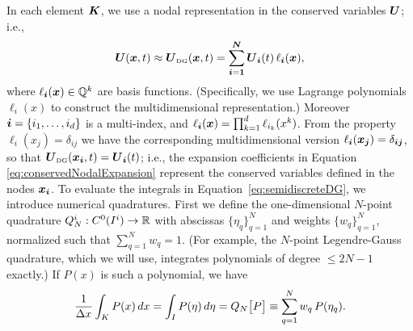 \documentclass[10pt,preprint]{aastex}
\begin{document}
In each element $\boldsymbol{K}$, we use a nodal representation in the conserved variables $\boldsymbol{U}$; i.e.,
\begin{equation}
  \boldsymbol{U}(\boldsymbol{x},t)\approx
  \boldsymbol{U}_{\mbox{\tiny DG}}(\boldsymbol{x},t)=\sum_{\boldsymbol{i}=\boldsymbol{1}}^{\boldsymbol{N}}\boldsymbol{U}_{\boldsymbol{i}}(t)\,\ell_{\boldsymbol{i}}(\boldsymbol{x}),
  \label{eq:conservedNodalExpansion}
\end{equation}
where $\ell_{\boldsymbol{i}}(\boldsymbol{x})\in\mathbb{Q}^{k}$ are basis functions.  
(Specifically, we use Lagrange polynomials $\ell_{i}(x)$ to construct the multidimensional representation.)  
Moreover $\boldsymbol{i}=\{i_{1},\ldots,i_{d}\}$ is a multi-index, and $\ell_{\boldsymbol{i}}(\boldsymbol{x})=\prod_{k=1}^{d}\ell_{i_{k}}(x^{k})$.  
From the property $\ell_{i}(x_{j})=\delta_{ij}$ we have the corresponding multidimensional version $\ell_{\boldsymbol{i}}(\boldsymbol{x}_{\boldsymbol{j}})=\delta_{\boldsymbol{i}\boldsymbol{j}}$, so that $\boldsymbol{U}_{\mbox{\tiny DG}}(\boldsymbol{x}_{\boldsymbol{i}},t)=\boldsymbol{U}_{\boldsymbol{i}}(t)$; i.e., the expansion coefficients in Equation \eqref{eq:conservedNodalExpansion} represent the conserved variables defined in the nodes $\boldsymbol{x}_{\boldsymbol{i}}$.  
To evaluate the integrals in Equation~\eqref{eq:semidiscreteDG}, we introduce numerical quadratures.  
First we define the one-dimensional $N$-point quadrature $Q_{N}^{i}:C^{0}(I^{i})\to\mathbb{R}$ with abscissas $\{\eta_{q}\}_{q=1}^{N}$ and weights $\{w_{q}\}_{q=1}^{N}$, normalized such that $\sum_{q=1}^{N}w_{q}=1$.  
(For example, the $N$-point Legendre-Gauss quadrature, which we will use, integrates polynomials of degree $\le 2N-1$ exactly.)
If $P(x)$ is such a polynomial, we have
\begin{equation}
  \frac{1}{\Delta x}\int_{K}P(x)\,dx=\int_{I}P(\eta)\,d\eta=Q_{N}\big[P\big]\equiv\sum_{q=1}^{N}w_{q}\,P(\eta_{q}).  
\end{equation}
\end{document}
